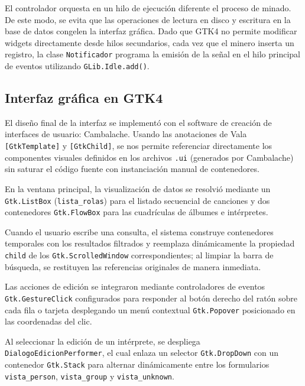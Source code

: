 \documentclass{rep}
\begin{document}
    El controlador orquesta en un hilo de ejecución diferente el
    proceso de minado. De este modo, se evita que las operaciones de
    lectura en disco y escritura en la base de datos congelen la
    interfaz gráfica. Dado que GTK4 no permite modificar widgets
    directamente desde hilos secundarios, cada vez que el minero
    inserta un registro, la clase \texttt{Notificador} programa la
    emisión de la señal en el hilo principal de eventos utilizando
    \texttt{GLib.Idle.add()}.

    \subsection{Interfaz gráfica en GTK4}

    El diseño final de la interfaz se implementó con el software de
    creación de interfaces de usuario: Cambalache. Usando las
    anotaciones de Vala \texttt{[GtkTemplate]} y \texttt{[GtkChild]},
    se nos permite referenciar directamente los componentes visuales
    definidos en los archivos \texttt{.ui} (generados por Cambalache)
    sin saturar el código fuente con instanciación manual de
    contenedores.

    En la ventana principal, la visualización de datos se resolvió
    mediante un \texttt{Gtk.ListBox} (\texttt{lista\_rolas}) para el
    listado secuencial de canciones y dos contenedores
    \texttt{Gtk.FlowBox} para las cuadrículas de álbumes e
    intérpretes.

    Cuando el usuario escribe una consulta, el sistema construye
    contenedores temporales con los resultados filtrados y reemplaza
    dinámicamente la propiedad \texttt{child} de los
    \texttt{Gtk.ScrolledWindow} correspondientes; al limpiar la barra
    de búsqueda, se restituyen las referencias originales de manera
    inmediata.

    Las acciones de edición se integraron mediante controladores de
    eventos \texttt{Gtk.GestureClick} configurados para responder al
    botón derecho del ratón sobre cada fila o tarjeta desplegando un
    menú contextual \texttt{Gtk.Popover} posicionado en las
    coordenadas del clic.

    Al seleccionar la edición de un intérprete, se despliega
    \texttt{DialogoEdicionPerformer}, el cual enlaza un selector
    \texttt{Gtk.DropDown} con un contenedor \texttt{Gtk.Stack} para
    alternar dinámicamente entre los formularios
    \texttt{vista\_person}, \texttt{vista\_group} y
    \texttt{vista\_unknown}.
\end{document}
